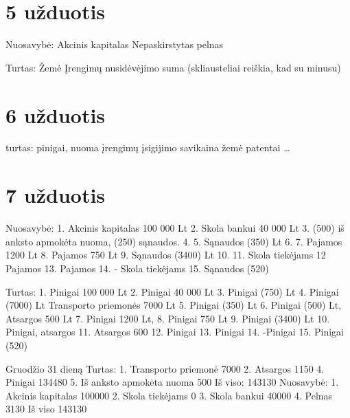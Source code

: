 \section{5 užduotis}

Nuosavybė:
Akcinis kapitalas
Nepaskirstytas pelnas

Turtas:
Žemė
Įrengimų nusidėvėjimo suma (skliausteliai reiškia, kad su minusu)

\section{6 užduotis}

turtas:
pinigai,
nuoma
įrengimų įsigijimo savikaina
žemė
patentai
…

\section{7 užduotis}

Nuosavybė:
1. Akcinis kapitalas 100 000 Lt
2. Skola bankui 40 000 Lt
3. (500) iš anksto apmokėta nuoma, (250) sąnaudos.
4.
5. Sąnaudos (350) Lt
6.
7. Pajamos 1200 Lt
8. Pajamos 750 Lt
9. Sąnaudos (3400) Lt
10.
11. Skola tiekėjams
12 Pajamos
13. Pajamos
14. - Skola tiekėjams
15. Sąnaudos (520)

Turtas:
1. Pinigai 100 000 Lt
2. Pinigai 40 000 Lt
3. Pinigai (750) Lt
4. Pinigai (7000) Lt Transporto priemonės 7000 Lt
5. Pinigai (350) Lt
6. Pinigai (500) Lt, Atsargos 500 Lt
7. Pinigai 1200 Lt,
8. Pinigai 750 Lt
9. Pinigai (3400) Lt
10. Pinigai, atsargos
11. Atsargos 600
12. Pinigai
13. Pinigai
14. -Pinigai
15. Pinigai (520)

Gruodžio 31 dieną
Turtas:
1. Transporto priemonė 7000
2. Atsargos 1150
4. Pinigai 134480
5. Iš anksto apmokėta nuoma 500
Iš viso: 143130
Nuosavybė:
1. Akcinis kapitalas 100000
2. Skola tiekėjams 0
3. Skola bankui 40000
4. Pelnas 3130
Iš viso 143130

